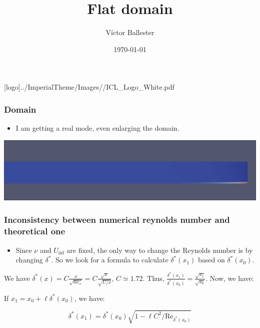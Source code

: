 \documentclass[
  aspectratio=169, %
  t, %
  onlytextwidth, %
  10pt, %
]{beamer}
\title{Flat domain} %
\subtitle{} %
\author{Víctor Ballester} %
\date{\today} %
\def\imagefolder{../ImperialTheme/Images/}
\def\Rey{\text{Re}}
\begin{document}
\begingroup
{} %
[logo]{\imagefolder/ICL_Logo_White.pdf} %
\frame[plain, s]{\titlepage} %
\endgroup

\begin{frame}
	\frametitle{Domain}
	\begin{itemize}
		\item I am getting a real mode, even enlarging the domain.
	\end{itemize}
	{
	\centering
	\includegraphics[width=1\textwidth]{Images/emode.png}
	}
\end{frame}
\begin{frame}
	\frametitle{Inconsistency between numerical reynolds number and theoretical one}
	\begin{itemize}
		\item Since $\nu$ and $U_\text{inf}$ are fixed, the only way to change the Reynolds number is by changing $\delta^*$. So we look for a formula to calculate $\delta^*(x_1)$ based on $\delta^*(x_0)$.
	\end{itemize}
	We have $\delta^*(x)=C\frac{x}{\sqrt{\Rey_x}}=C\frac{\sqrt{x}}{\sqrt{U/\nu}}$, $C\simeq 1.72$. Thus, $\frac{\delta^*(x_1)}{\delta^*(x_0)}=\frac{\sqrt{x_1}}{\sqrt{x_0}}$.
	Now, we have:

	If $x_1 = x_0 + \ell \delta^*(x_0)$, we have:

	$$
	  \delta^*(x_1) = \delta^*(x_0) \sqrt{1-\ell C^2/\Rey_{\delta^*(x_0)}}
	$$
\end{frame}
\end{document}
